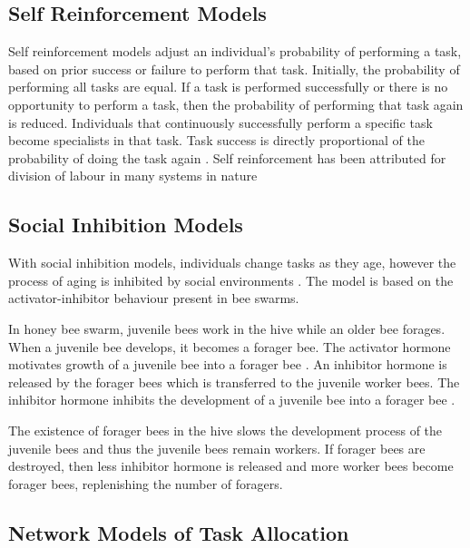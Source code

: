\subsection{Self Reinforcement Models}
\label{selfreinforcement}

Self reinforcement models adjust an individual's probability of performing a task, based on prior success or failure to perform that task. Initially, the probability of performing all tasks are equal. If a task is performed successfully or there is  no opportunity to perform a task, then the probability of performing that task again is reduced. Individuals that continuously successfully perform a specific task become specialists in that task. Task success is directly proportional of the probability of doing the task again \cite{theraulaz1998response, pasteels1987individual}. Self reinforcement has been attributed for division of labour in many systems in nature \cite{spencer1998dynamics}%

    

\subsection{Social Inhibition Models}
With social inhibition models, individuals change tasks as they age, however the process of aging is inhibited by social environments \cite{huang1992honeybee}. The model is based on the activator-inhibitor behaviour present in bee swarms. 

In honey bee swarm, juvenile bees work in the hive while an older bee forages. When a juvenile bee develops, it becomes a forager bee. The activator hormone motivates growth of a juvenile bee into a forager bee \cite{robinson1989genetic}. An inhibitor hormone is released by the forager bees which is transferred to the juvenile worker bees. The inhibitor hormone inhibits the development of a juvenile bee into a forager bee \cite{huang1992honeybee}.

The existence of forager bees in the hive slows the development process of the juvenile bees and thus the juvenile bees remain workers. If forager bees are destroyed, then less inhibitor hormone is released and more worker bees become forager bees, replenishing the number of foragers. 

                                
\subsection{Network Models of Task Allocation}

